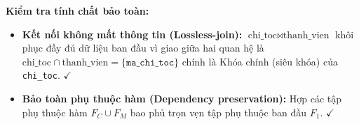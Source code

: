 \textbf{Kiểm tra tính chất bảo toàn:}
\begin{itemize}[noitemsep]
    \item \textbf{Kết nối không mất thông tin (Lossless-join):} $\text{chi\_toc} \bowtie \text{thanh\_vien}$ khôi phục đầy đủ dữ liệu ban đầu vì giao giữa hai quan hệ là $\text{chi\_toc} \cap \text{thanh\_vien} = \{\texttt{ma\_chi\_toc}\}$ chính là Khóa chính (siêu khóa) của \texttt{chi\_toc}. $\checkmark$
    \item \textbf{Bảo toàn phụ thuộc hàm (Dependency preservation):} Hợp các tập phụ thuộc hàm $F_C \cup F_M$ bao phủ trọn vẹn tập phụ thuộc ban đầu $F_1$. $\checkmark$
\end{itemize}
